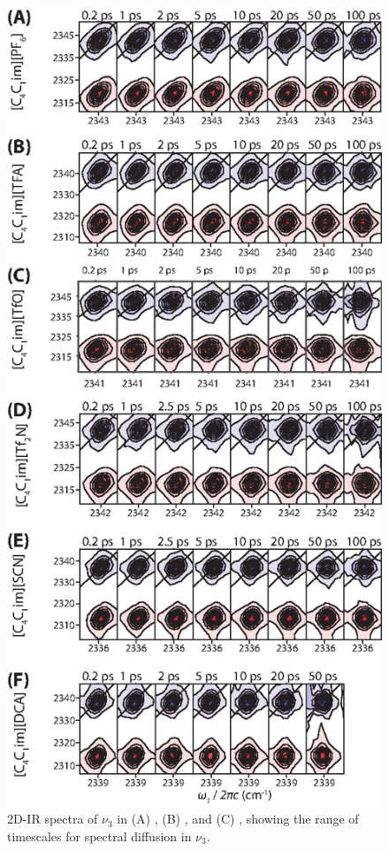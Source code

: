 {\begin{figure}[h]
  \centering
  \includegraphics[scale=1.0]{./paper_01/all_2d.eps}
  \caption{\label{fig:all 2D}2D-IR spectra of  \(\nu_3\) in \ce{[Im_{4,1}+]} (A) \ce{[PF6]-}, (B) \ce{[Tf2N]-}, and (C) \ce{[DCA]-}, showing the range of timescales for spectral diffusion in \(\nu_3\).}
\end{figure}

}
